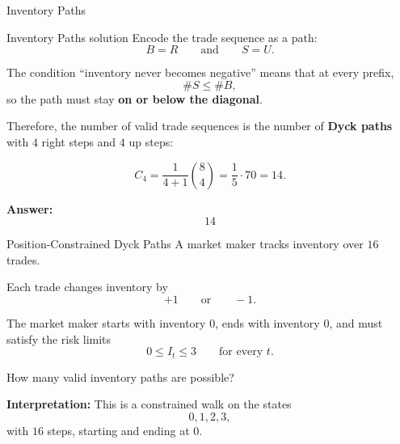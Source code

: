 \begin{frame}{Inventory Paths}
  \begin{center}
  \end{center}
\end{frame}

\begin{frame}{Inventory Paths solution}
  Encode the trade sequence as a path:
  \[
    B = R
    \qquad\text{and}\qquad
    S = U.
  \]

  \vspace{0.5em}

  The condition “inventory never becomes negative” means that at every prefix,
  \[
    \#S \le \#B,
  \]
  so the path must stay \textbf{on or below the diagonal}.

  \vspace{0.5em}

  Therefore, the number of valid trade sequences is the number of
  \textbf{Dyck paths} with \(4\) right steps and \(4\) up steps:

  \[
    C_4 = \frac{1}{4+1}\binom{8}{4}
    = \frac{1}{5}\cdot 70
    = 14.
  \]

  \textbf{Answer:}
  \[
    \boxed{14}
  \]
\end{frame}

\begin{frame}{Position-Constrained Dyck Paths}
  \textcolor{sqt-question}{
    A market maker tracks inventory over \(16\) trades.
  }

  Each trade changes inventory by
  \[
    +1 \qquad \text{or} \qquad -1.
  \]

  The market maker starts with inventory \(0\), ends with inventory \(0\), and must satisfy
  the risk limits
  \[
    0 \le I_t \le 3
    \qquad \text{for every } t.
  \]

  \begin{sqt:definition}
    How many valid inventory paths are possible?
  \end{sqt:definition}

  \textbf{Interpretation:}
  This is a constrained walk on the states
  \[
    0,1,2,3,
  \]
  with \(16\) steps, starting and ending at \(0\).
\end{frame}


